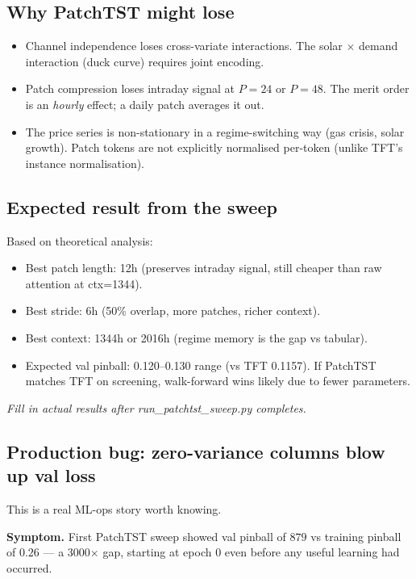 \subsection{Why PatchTST might lose}

\begin{itemize}
  \item Channel independence loses cross-variate interactions.
        The solar $\times$ demand interaction (duck curve) requires
        joint encoding.
  \item Patch compression loses intraday signal at $P=24$ or $P=48$.
        The merit order is an \emph{hourly} effect; a daily patch
        averages it out.
  \item The price series is non-stationary in a regime-switching way
        (gas crisis, solar growth). Patch tokens are not explicitly
        normalised per-token (unlike TFT's instance normalisation).
\end{itemize}

\subsection{Expected result from the sweep}

Based on theoretical analysis:
\begin{itemize}
  \item Best patch length: 12h (preserves intraday signal, still cheaper
        than raw attention at ctx=1344).
  \item Best stride: 6h (50\% overlap, more patches, richer context).
  \item Best context: 1344h or 2016h (regime memory is the gap vs tabular).
  \item Expected val pinball: 0.120--0.130 range (vs TFT 0.1157).
        If PatchTST matches TFT on screening, walk-forward wins likely
        due to fewer parameters.
\end{itemize}

\textit{Fill in actual results after run\_patchtst\_sweep.py completes.}

\subsection{Production bug: zero-variance columns blow up val loss}

This is a real ML-ops story worth knowing.

\textbf{Symptom.} First PatchTST sweep showed val pinball of $879$ vs training
pinball of $0.26$ --- a 3000$\times$ gap, starting at epoch 0 even before
any useful learning had occurred.

